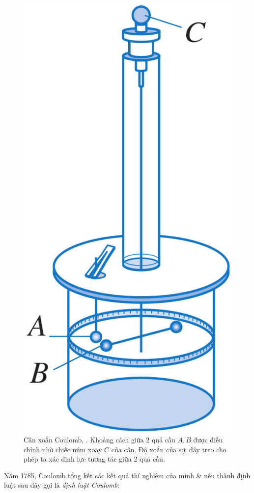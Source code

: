 \documentclass[oneside]{book}
\numberwithin{equation}{section}
\begin{document}
\begin{figure}[H]
	\centering
	\includegraphics[scale=0.15]{can_xoan_Coulomb}
	\caption{Cân xoắn Coulomb, \cite[Hình 1.5, p. 7]{SGK_Vat_Ly_11_nang_cao}. Khoảng cách giữa 2 quả cầu $A,B$ được điều chỉnh nhờ chiếc núm xoay $C$ của cân. Độ xoắn của sợi dây treo cho phép ta xác định lực tương tác giữa 2 quả cầu.}
	\label{fig:can xoan Coulomb}
\end{figure}
Năm 1785, Coulomb tổng kết các kết quả thí nghiệm của mình \& nêu thành định luật sau đây gọi là \textit{định luật Coulomb}:
\end{document}
